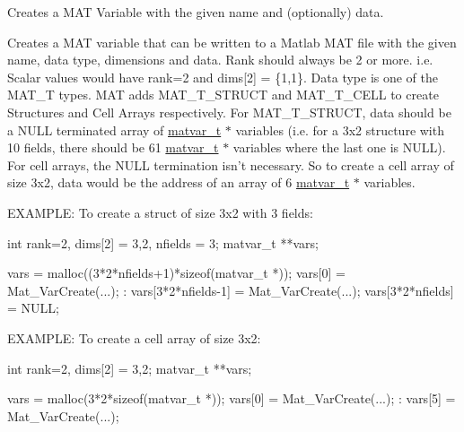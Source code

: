 Creates a MAT Variable with the given name and (optionally) data. 

Creates a MAT variable that can be written to a Matlab MAT file with the given name, data type, dimensions and data. Rank should always be 2 or more. i.e. Scalar values would have rank=2 and dims\mbox{[}2\mbox{]} = \{1,1\}. Data type is one of the MAT\_\-T types. MAT adds MAT\_\-T\_\-STRUCT and MAT\_\-T\_\-CELL to create Structures and Cell Arrays respectively. For MAT\_\-T\_\-STRUCT, data should be a NULL terminated array of \hyperlink{structmatvar__t}{matvar\_\-t} $\ast$ variables (i.e. for a 3x2 structure with 10 fields, there should be 61 \hyperlink{structmatvar__t}{matvar\_\-t} $\ast$ variables where the last one is NULL). For cell arrays, the NULL termination isn't necessary. So to create a cell array of size 3x2, data would be the address of an array of 6 \hyperlink{structmatvar__t}{matvar\_\-t} $\ast$ variables.

EXAMPLE: To create a struct of size 3x2 with 3 fields: 
\begin{DoxyCode}
     int rank=2, dims[2] = {3,2}, nfields = 3;
     matvar_t **vars;

     vars = malloc((3*2*nfields+1)*sizeof(matvar_t *));
     vars[0]             = Mat_VarCreate(...);
        :
     vars[3*2*nfields-1] = Mat_VarCreate(...);
     vars[3*2*nfields]   = NULL;
\end{DoxyCode}


EXAMPLE: To create a cell array of size 3x2: 
\begin{DoxyCode}
     int rank=2, dims[2] = {3,2};
     matvar_t **vars;

     vars = malloc(3*2*sizeof(matvar_t *));
     vars[0]             = Mat_VarCreate(...);
        :
     vars[5] = Mat_VarCreate(...);
\end{DoxyCode}



